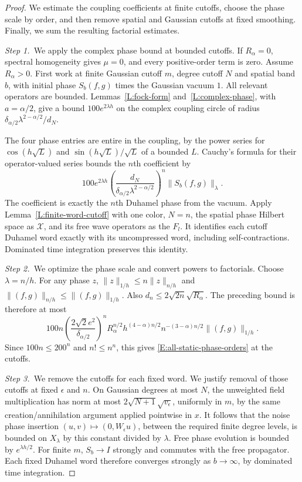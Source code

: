 \documentclass[12pt,oneside,openany]{book}
\numberwithin{equation}{section}
\theoremstyle{nogostyle}
\theoremstyle{definition}
\begin{document}
\begin{proof}
  We estimate the coupling coefficients at finite cutoffs, choose the phase
  scale by order, and then remove spatial and Gaussian cutoffs at fixed
  smoothing. Finally, we sum the resulting factorial estimates.


  \medskip
  \noindent\textit{Step 1.~}We apply the complex phase bound at bounded
  cutoffs.
  If $R_\alpha = 0$, spectral homogeneity gives $\mu = 0$, and every
  positive-order term is zero. Assume $R_\alpha > 0$. First work at finite
  Gaussian cutoff $m$, degree cutoff $N$ and spatial band $b$, with initial
  phase $S_b(f,g)$ times the Gaussian vacuum $1$. All relevant operators are
  bounded. Lemmas~\ref{L:fock-form} and~\ref{L:complex-phase}, with $a =
  \alpha/2$, give a bound $100e^{2\lambda h}$ on the complex coupling circle of
  radius $\delta_{\alpha/2}\lambda^{2-\alpha/2}/d_N$.

  The four phase entries are entire in the coupling, by the power series for
  $\cos(h\sqrt L)$ and $\sin(h\sqrt L)/\sqrt L$ of a bounded $L$. Cauchy's
  formula for their operator-valued series bounds the $n$th coefficient by
  \[
    100e^{2\lambda h}
    \left(\frac{d_N}
    {\delta_{\alpha/2}\lambda^{2-\alpha/2}}\right)^n
    \|S_b(f,g)\|_\lambda .
  \]
  The coefficient is exactly the $n$th Duhamel phase from the vacuum. Apply
  Lemma~\ref{L:finite-word-cutoff} with one color, $N = n$, the spatial phase
  Hilbert space as $\mathscr{X}$, and its free wave operators as the $F_l$. It
  identifies each cutoff Duhamel word exactly with its uncompressed word,
  including self-contractions. Dominated time integration preserves this
  identity.


  \medskip
  \noindent\textit{Step 2.~}We optimize the phase scale and convert powers to
  factorials.
  Choose $\lambda = n/h$. For any phase $z$, $\|z\|_{1/h} \le n\|z\|_{n/h}$ and
  $\|(f,g)\|_{n/h} \le \|(f,g)\|_{1/h}$. Also $d_n \le
  2\sqrt{2n}\sqrt{R_\alpha}$. The preceding bound is therefore at most
  \[
    100n\left(\frac{2\sqrt2 e^2}{\delta_{\alpha/2}}\right)^n
    R_\alpha^{n/2}h^{(4-\alpha)n/2}
    n^{-(3-\alpha)n/2}\|(f,g)\|_{1/h}.
  \]
  Since $100n \le 200^n$ and $n! \le n^n$, this gives
  \eqref{E:all-static-phase-orders} at the cutoffs.


  \medskip
  \noindent\textit{Step 3.~}We remove the cutoffs for each fixed word.
  We justify removal of those cutoffs at fixed $\epsilon$ and $n$. On Gaussian
  degrees at most $N$, the unweighted field multiplication has norm at most
  $2\sqrt{N+1}\sqrt{v_\epsilon}$, uniformly in $m$, by the same
  creation/annihilation argument applied pointwise in $x$. It follows that the
  noise phase insertion $(u,v)\mapsto(0,W_\epsilon u)$, between the required
  finite degree levels, is bounded on $X_\lambda$ by this constant divided by
  $\lambda$. Free phase evolution is bounded by $e^{\lambda h/2}$. For finite
  $m$, $S_b \to I$ strongly and commutes with the free propagator. Each fixed
  Duhamel word therefore converges strongly as $b \to \infty$, by dominated time
  integration.


\end{proof}
\end{document}
